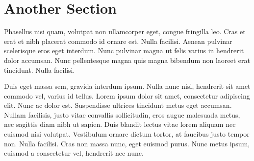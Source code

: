 \section{Another Section}

Phasellus nisi quam, volutpat non ullamcorper eget, congue fringilla leo. Cras et erat et nibh placerat commodo id ornare est. Nulla facilisi. Aenean pulvinar scelerisque eros eget interdum. Nunc pulvinar magna ut felis varius in hendrerit dolor accumsan. Nunc pellentesque magna quis magna bibendum non laoreet erat tincidunt. Nulla facilisi.

Duis eget massa sem, gravida interdum ipsum. Nulla nunc nisl, hendrerit sit amet commodo vel, varius id tellus. Lorem ipsum dolor sit amet, consectetur adipiscing elit. Nunc ac dolor est. Suspendisse ultrices tincidunt metus eget accumsan. Nullam facilisis, justo vitae convallis sollicitudin, eros augue malesuada metus, nec sagittis diam nibh ut sapien. Duis blandit lectus vitae lorem aliquam nec euismod nisi volutpat. Vestibulum ornare dictum tortor, at faucibus justo tempor non. Nulla facilisi. Cras non massa nunc, eget euismod purus. Nunc metus ipsum, euismod a consectetur vel, hendrerit nec nunc.